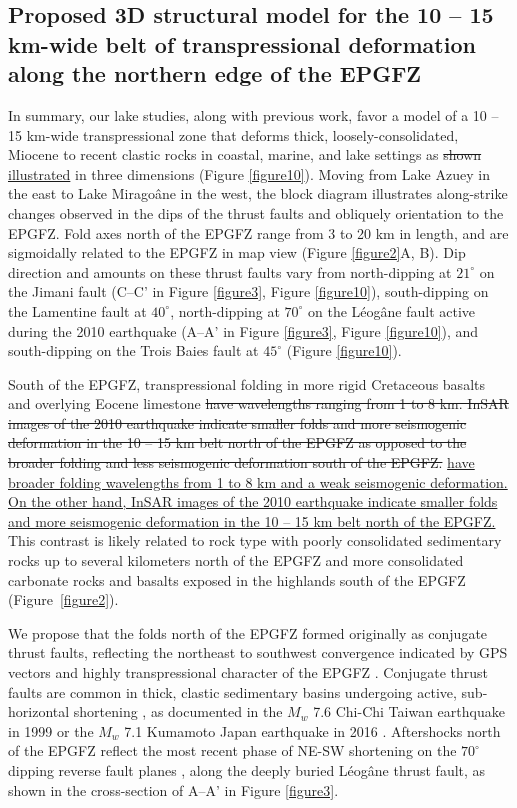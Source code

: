 \documentclass[linenumbers,draft]{agujournal}
\providecommand{\DIFdel}[1]{{\protect\color{red}\sout{#1}}}                      %
\providecommand{\DIFaddbegin}{} %
\providecommand{\DIFaddend}{} %
\providecommand{\DIFdelbegin}{} %
\providecommand{\DIFdelend}{} %
\begin{document}
\subsection{Proposed 3D structural model for the 10 -- 15 km-wide belt of transpressional deformation along the northern edge of the EPGFZ}
In summary, our lake studies, along with previous work, favor a model of a 10 -- 15 km-wide transpressional zone that deforms thick, loosely-consolidated, Miocene to recent clastic rocks in coastal, marine, and lake settings as \DIFdelbegin \DIFdel{shown }\DIFdelend \DIFaddbegin \ul{illustrated} \DIFaddend in three dimensions (Figure \ref{figure10}). Moving from Lake Azuey in the east to Lake Mirago\^ane in the west, the block diagram illustrates along-strike changes observed in the dips of the thrust faults and obliquely orientation to the EPGFZ. Fold axes north of the EPGFZ range from 3 to 20 km in length, and are sigmoidally related to the EPGFZ in map view (Figure \ref{figure2}A, B). Dip direction and amounts on these thrust faults vary from north-dipping at $21^{\circ}$ on the Jimani fault (C--C' in Figure \ref{figure3}, Figure \ref{figure10}), south-dipping on the Lamentine fault \citep{saint2015seismotectonics} at $40^{\circ}$, north-dipping at $70^{\circ}$ on the L\'eog\^ane fault active during the 2010 earthquake (A--A' in Figure \ref{figure3}, Figure \ref{figure10}), and south-dipping on the Trois Baies fault at $45^{\circ}$ (Figure \ref{figure10}). 

South of the EPGFZ, transpressional folding in more rigid Cretaceous basalts and overlying Eocene limestone \DIFdelbegin \DIFdel{have wavelengths ranging from 1 to 8 km. InSAR images of the 2010 earthquake indicate smaller folds and more seismogenic deformation in the 10 -- 15 km belt north of the EPGFZ as opposed to the broader folding and less seismogenic deformation south of the EPGFZ. }\DIFdelend \DIFaddbegin \ul{have broader folding wavelengths from 1 to 8 km and a weak seismogenic deformation. On the other hand, InSAR images of the 2010 earthquake indicate smaller folds and more seismogenic deformation in the 10 -- 15 km belt north of the EPGFZ.} \DIFaddend This contrast is likely related to rock type with poorly consolidated sedimentary rocks up to several kilometers north of the EPGFZ and more consolidated carbonate rocks and basalts exposed in the highlands south of the EPGFZ (Figure~\ref{figure2}).

We propose that the folds north of the EPGFZ formed originally as conjugate thrust faults, reflecting the northeast to southwest convergence indicated by GPS vectors and highly transpressional character of the EPGFZ \citep{calais2010transpressional}. Conjugate thrust faults are common in thick, clastic sedimentary basins undergoing active, sub-horizontal shortening \citep{sibson2012reverse}, as documented in the $M_w$ 7.6 Chi-Chi Taiwan earthquake in 1999 \citep{chen2002conjugate} or the $M_w$ 7.1 Kumamoto Japan earthquake in 2016 \citep{lin2017coseismic}. Aftershocks north of the EPGFZ reflect the most recent phase of NE-SW shortening on the $70^{\circ}$ dipping reverse fault planes \citep{nettles2010earthquake}, along the deeply buried L\'eog\^ane thrust fault, as shown in the cross-section of A--A' in Figure \ref{figure3}.
\end{document}
